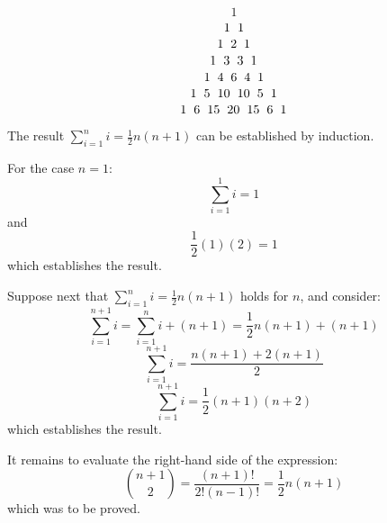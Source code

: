 \documentclass[a4paper,12pt]{article}
\begin{document}
\[ 1 \]
\[ 1 \hspace{2mm} 1 \]
\[ 1 \hspace{2mm} 2 \hspace{2mm} 1 \] 
\[ 1 \hspace{2mm} 3 \hspace{2mm} 3 \hspace{2mm} 1 \]
\[ 1 \hspace{2mm} 4 \hspace{2mm} 6 \hspace{2mm} 4 \hspace{2mm} 1 \]
\[ 1 \hspace{2mm} 5 \hspace{2mm} 10 \hspace{2mm} 10 \hspace{2mm} 5 \hspace{2mm} 1 \]
\[ 1 \hspace{2mm} 6 \hspace{2mm} 15 \hspace{2mm} 20  \hspace{2mm}15 \hspace{2mm} 6 \hspace{2mm} 1 \]

\vspace{5mm}

The result $\sum_{i=1}^n i = \frac{1}{2}n(n+1)$ can be established by induction. 

For the case $n=1$:
\[ \sum_{i=1}^1 i = 1\] 
and
\[ \frac{1}{2}(1)(2) =  1\]
which establishes the result.

Suppose next that $\sum_{i=1}^n i = \frac{1}{2}n(n+1)$ holds for $n$, and consider:
\[ \sum_{i=1}^{n+1} i = \sum_{i=1}^n i + (n+1) = \frac{1}{2}n(n+1) + (n+1) \]
\[  \sum_{i=1}^{n+1} i = \frac{n(n+1) + 2(n+1)}{2} \]
\[ \sum_{i=1}^{n+1} i = \frac{1}{2}(n+1)(n+2) \]
which establishes the result.

It remains to evaluate the right-hand side of the expression:
\[ \binom{n+1}{2} = \frac{(n+1)!}{2!(n-1)!}  = \frac{1}{2}n(n+1) \]
which was to be proved.

\vspace{5mm}
\end{document}
